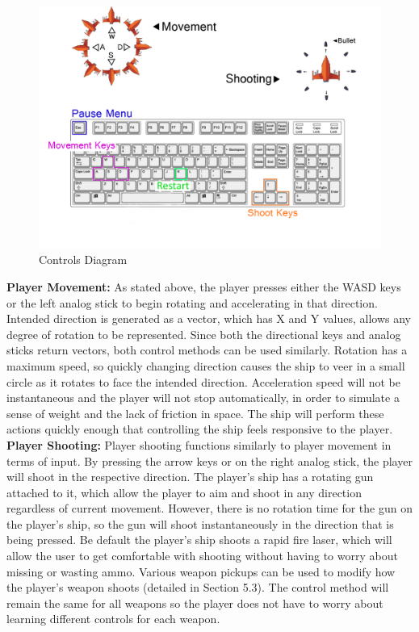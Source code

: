 \documentclass[12pt]{article}       %
\begin{document}
\begin{figure} [H]
\centering
\includegraphics[width=6.3 in]{ControlDiagramFinal.png}
\caption{Controls Diagram} \label{Controls}
\end{figure}

	{\bf Player Movement:}	As stated above, the player presses either the WASD keys or the left analog stick to begin rotating and accelerating in that direction. Intended direction is generated as a vector, which has X and Y values, allows any degree of rotation to be represented. Since both the directional keys and analog sticks return vectors, both control methods can be used similarly. Rotation has a maximum speed, so quickly changing direction causes the ship to veer in a small circle as it rotates to face the intended direction. Acceleration speed will not be instantaneous and the player will not stop automatically, in order to simulate a sense of weight and the lack of friction in space. The ship will perform these actions quickly enough that controlling the ship feels responsive to the player. \\

	{\bf Player Shooting:} Player shooting functions similarly to player movement in terms of input. By pressing the arrow keys or on the right analog stick, the player will shoot in the respective direction. The player's ship has a rotating gun attached to it, which allow the player to aim and shoot in any direction regardless of current movement. However, there is no rotation time for the gun on the player's ship, so the gun will shoot instantaneously in the direction that is being pressed. Be default the player's ship shoots a rapid fire laser, which will allow the user to get comfortable with shooting without having to worry about missing or wasting ammo. Various weapon pickups can be used to modify how the player's weapon shoots (detailed in Section 5.3). The control method will remain the same for all weapons so the player does not have to worry about learning different controls for each weapon. \\
\end{document}
